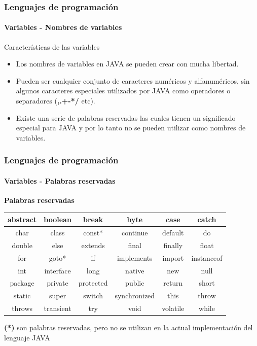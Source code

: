 \documentclass{beamer}
\begin{document}
		\begin{frame}
			\frametitle{Lenguajes de programaci\'on}
			\framesubtitle{Variables - Nombres de variables}

			\begin{block}{Caracter\'isticas de las variables}
				\begin{itemize}
					\item Los nombres de variables en JAVA se pueden crear con mucha libertad.
					\item Pueden ser cualquier conjunto de caracteres num\'ericos y alfanum\'ericos, sin algunos caracteres especiales utilizados por JAVA como operadores o separadores (\textbf{,.+-*/} etc).
					\item Existe una serie de palabras reservadas las cuales tienen un significado especial para JAVA y por lo tanto no se pueden utilizar como nombres de variables.
				\end{itemize}
			\end{block}
		\end{frame}

		\begin{frame}
			\frametitle{Lenguajes de programaci\'on}
			\framesubtitle{Variables - Palabras reservadas}

			\textbf{Palabras reservadas}
			\begin{center}
				\begin{tabular}{|c|c|c|c|c|c|} \hline
					abstract    & boolean & break         & byte                 & case     & catch        \\ \hline
					char          & class       & const*        & continue         & default & do              \\ \hline
					double     & else         & extends     & final                 & finally   & float \\ \hline
					for             & goto*       & if                 & implements    & import  & instanceof \\ \hline
					int             & interface  & long          & native              & new      & null \\ \hline
					package  & private     & protected & public              & return   & short \\ \hline
					static        & super       & switch       & synchronized & this       & throw \\ \hline
					throws      & transient & try              & void                  & volatile & while \\ \hline
				\end{tabular}
			\end{center}
			\textbf{(*)} son palabras reservadas, pero no se utilizan en la actual implementaci\'on del lenguaje JAVA
		\end{frame}
\end{document}
